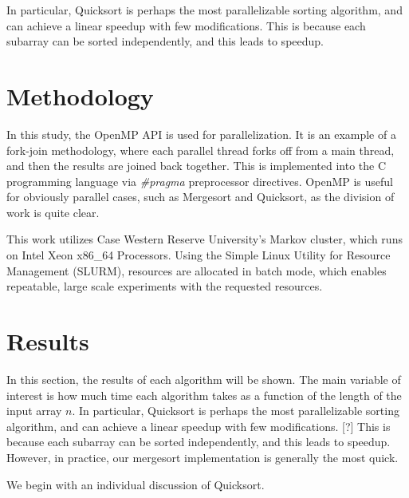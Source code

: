 \documentclass[conference]{IEEEtran}
\begin{document}
	In particular, Quicksort is perhaps the most parallelizable sorting algorithm, and can achieve a linear speedup with few modifications. \cite{blelloch_programming_1996}
	This is because each subarray can be sorted independently, and this leads to speedup.
	\section{Methodology}
	In this study, the OpenMP \cite{openmp08} API is used for parallelization.
	It is an example of a fork-join methodology, where each parallel thread forks off from a main thread, and then the results are joined back together.
	This is implemented into the C programming language via \textit{\#pragma} preprocessor directives.
	OpenMP is useful for obviously parallel cases, such as Mergesort and Quicksort, as the division of work is quite clear.
	
	This work utilizes Case Western Reserve University's Markov cluster, which runs on Intel Xeon x86\_64 Processors.
	Using the Simple Linux Utility for Resource Management \cite{yoo_slurm_2003} (SLURM), resources are allocated in batch mode, which enables repeatable, large scale experiments with the requested resources.
	
	\section{Results}
	In this section, the results of each algorithm will be shown.
	The main variable of interest is how much time each algorithm takes as a function of the length of the input array $n$. In particular, Quicksort is perhaps the most parallelizable sorting algorithm, and can achieve a linear speedup with few modifications. [?] This is because each subarray can be sorted independently, and this leads to speedup. However, in practice, our mergesort implementation is generally the most quick.
	
	
	
	We begin with an individual discussion of Quicksort.
	
\end{document}
